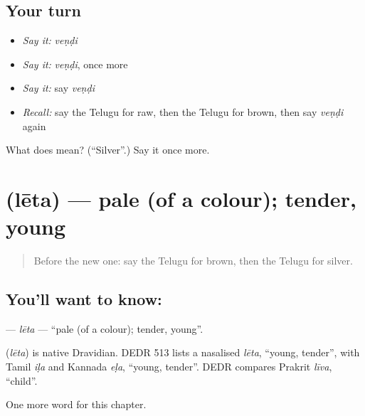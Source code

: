 \subsection*{Your turn}
\begin{itemize}
\raggedright
  \item \emph{Say it:} \emph{veṇḍi}
  \item \emph{Say it:} \emph{veṇḍi}, once more
  \item \emph{Say it:} say \emph{veṇḍi}
  \item \emph{Recall:} say the Telugu for raw, then the Telugu for brown, then say \emph{veṇḍi} again
\end{itemize}

\begin{tcolorbox}[breakable,colback=teal!4,colframe=teal!35!black,title={Before you move on}]
What does  mean? (\textquotedblleft{}Silver\textquotedblright{}.) Say it once more.
\end{tcolorbox}
\section[\texorpdfstring{\te{లేత} (lēta)}{లేత (lēta)}]{ (lēta) — pale (of a colour); tender, young}

\label{lesson:TE-C221-leta}



\begin{quote}
Before the new one: say the Telugu for brown, then the Telugu for silver.
\end{quote}

\subsection*{You'll want to know: }
\textbf{} — \emph{lēta} — \textquotedblleft{}pale (of a colour); tender, young\textquotedblright{}.

\begin{cousinweb}
\textbf{} (\emph{lēta}) is native Dravidian. DEDR 513 lists a nasalised \emph{lēta}, \textquotedblleft{}young, tender\textquotedblright{}, with Tamil \emph{iḷa} and Kannada \emph{eḷa}, \textquotedblleft{}young, tender\textquotedblright{}. DEDR compares Prakrit \emph{līva}, \textquotedblleft{}child\textquotedblright{}.
\end{cousinweb}

\begin{grammarlens}[title={What you've built}]
One more word for this chapter.
\end{grammarlens}

